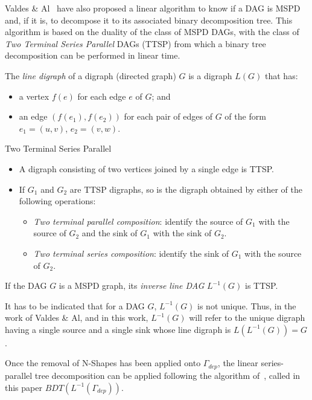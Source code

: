 Valdes \& Al~\cite{Valdes:1979:RSP:800135.804393} have also proposed a linear algorithm to know if a DAG is MSPD and, if it is, to decompose it to its associated binary decomposition tree. This algorithm is based on the duality of the class of MSPD DAGs, with the class of \emph{Two Terminal Series Parallel} DAGs (TTSP) from which a binary tree decomposition can be performed in linear time. 

\begin{mydef}
The \emph{line digraph} of a digraph (directed graph) $G$ is a digraph $L(G)$ that has:
\begin{itemize}
\item a vertex $f(e)$ for each edge $e$ of $G$; and
\item an edge $(f(e_1),f(e_2))$ for each pair of edges of $G$ of the form $e_1=(u,v)$, $e_2=(v,w)$.
\end{itemize}
\end{mydef}

\begin{mydef}Two Terminal Series Parallel
\begin{itemize}
\item A digraph consisting of two vertices joined by a single edge is TTSP.
\item If $G_1$ and $G_2$ are TTSP digraphs, so is the digraph obtained by either of the following operations:
\begin{itemize}
\item \emph{Two terminal parallel composition}: identify the source of $G_1$ with the source of $G_2$ and the sink of $G_1$ with the sink of $G_2$.
\item \emph{Two terminal series composition}: identify the sink of $G_1$ with the source of $G_2$.
\end{itemize}
\end{itemize}
\end{mydef}

\begin{myth}
If the DAG $G$ is a MSPD graph, its \emph{inverse line DAG} $L^{-1}(G)$ is TTSP.
\end{myth}

It has to be indicated that for a DAG $G$, $L^{-1}(G)$ is not unique. Thus, in the work of Valdes \& Al, and in this work, $L^{-1}(G)$ will refer to the unique digraph having a single source and a single sink whose line digraph is $L(L^{-1}(G))=G$.

Once the removal of N-Shapes has been applied onto $\Gamma_{dep}$, the linear series-parallel tree decomposition can be applied following the algorithm of~\cite{Valdes:1979:RSP:800135.804393}, called in this paper $BDT(L^{-1}(\Gamma_{dep}))$.

